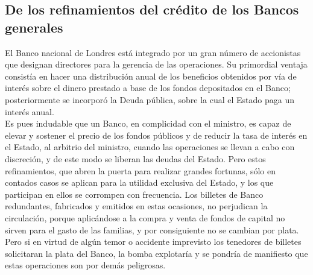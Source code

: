 \documentclass[10pt]{article}
\begin{document}
\begin{multicols}{1}
\section*{De los refinamientos del crédito de los Bancos generales}
El Banco nacional de Londres está integrado por un gran número de accionistas que designan directores para la gerencia de las operaciones. Su primordial ventaja consistía en hacer una distribución anual de los beneficios obtenidos por vía de interés sobre el dinero prestado a base de los fondos depositados en el Banco; posteriormente se incorporó la Deuda pública, sobre la cual el Estado paga un interés anual.\\
Es pues indudable que un Banco, en complicidad con el ministro, es capaz de elevar y sostener el precio de los fondos públicos y de reducir la tasa de interés en el Estado, al arbitrio del ministro, cuando las operaciones se llevan a cabo con discreción, y de este modo se liberan las deudas del Estado. Pero estos refinamientos, que abren la puerta para realizar grandes fortunas, sólo en contados casos se aplican para la utilidad exclusiva del Estado, y los que participan en ellos se corrompen con frecuencia. Los billetes de Banco redundantes, fabricados y emitidos en estas ocasiones, no perjudican la circulación, porque aplicándose a la compra y venta de fondos de capital no sirven para el gasto de las familias, y por consiguiente no se cambian por plata. Pero si en virtud de algún temor o accidente imprevisto los tenedores de billetes solicitaran la plata del Banco, la bomba explotaría y se pondría de manifiesto que estas operaciones son por demás peligrosas.
\end{multicols}
\end{document}
